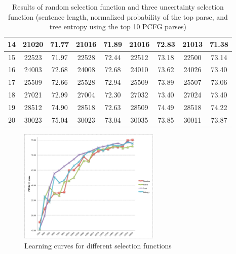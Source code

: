 \documentclass[winfonts,UTF8]{article}
\begin{document}
\begin{enumerate}
\begin{table}[!htbp]
{\begin{tabular}{c|c|c|c|c|c|c|c|c}
\hline
14 & 21020 & 71.77 & 21016 & 71.89 & 21016 & 72.83 & 21013 & 71.38\\
\hline
15 & 22523 & 71.97 & 22528 & 72.44 & 22512 & 73.18 & 22500 & 73.14\\
\hline
16 & 24003 & 72.68 & 24008 & 72.68 & 24010 & 73.62 & 24026 & 73.40\\
\hline
17 & 25509 & 72.66 & 25528 & 72.94 & 25509 & 73.89 & 25507 & 73.06\\
\hline
18 & 27021 & 72.99 & 27004 & 72.30 & 27032 & 73.40 & 27024 & 73.40\\
\hline
19 & 28512 & 74.90 & 28518 & 72.63 & 28509 & 74.49 & 28518 & 74.22\\
\hline
20 & 30023 & 75.04 & 30023 & 73.04 & 30035 & 73.85 & 30011 & 73.87\\
\hline
\end{tabular} 
}
\caption{Results of random selection function and three uncertainty selection function (sentence length, normalized probability of the top parse, and tree entropy using the top 10 PCFG parses)}
\label{tab:res}
\end{table}


\begin{figure}[!htbp]
\centering
\includegraphics[width=0.6\textwidth]{res1.pdf}
\caption{Learning curves for different selection functions}
\label{fig:curve}
\end{figure}






\end{enumerate}
\end{document}
